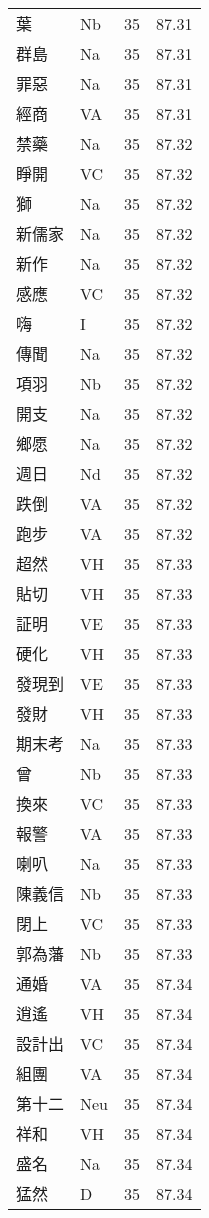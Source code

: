 \documentclass[twocolumn]{book}
\begin{document}
\begin{supertabular}{llrr}
葉 & Nb & 35 &  87.31\\
群島 & Na & 35 &  87.31\\
罪惡 & Na & 35 &  87.31\\
經商 & VA & 35 &  87.31\\
禁藥 & Na & 35 &  87.32\\
睜開 & VC & 35 &  87.32\\
獅 & Na & 35 &  87.32\\
新儒家 & Na & 35 &  87.32\\
新作 & Na & 35 &  87.32\\
感應 & VC & 35 &  87.32\\
嗨 & I & 35 &  87.32\\
傳聞 & Na & 35 &  87.32\\
項羽 & Nb & 35 &  87.32\\
開支 & Na & 35 &  87.32\\
鄉愿 & Na & 35 &  87.32\\
週日 & Nd & 35 &  87.32\\
跌倒 & VA & 35 &  87.32\\
跑步 & VA & 35 &  87.32\\
超然 & VH & 35 &  87.33\\
貼切 & VH & 35 &  87.33\\
証明 & VE & 35 &  87.33\\
硬化 & VH & 35 &  87.33\\
發現到 & VE & 35 &  87.33\\
發財 & VH & 35 &  87.33\\
期末考 & Na & 35 &  87.33\\
曾 & Nb & 35 &  87.33\\
換來 & VC & 35 &  87.33\\
報警 & VA & 35 &  87.33\\
喇叭 & Na & 35 &  87.33\\
陳義信 & Nb & 35 &  87.33\\
閉上 & VC & 35 &  87.33\\
郭為藩 & Nb & 35 &  87.33\\
通婚 & VA & 35 &  87.34\\
逍遙 & VH & 35 &  87.34\\
設計出 & VC & 35 &  87.34\\
組團 & VA & 35 &  87.34\\
第十二 & Neu & 35 &  87.34\\
祥和 & VH & 35 &  87.34\\
盛名 & Na & 35 &  87.34\\
猛然 & D & 35 &  87.34\\

\end{supertabular}
\end{document}
